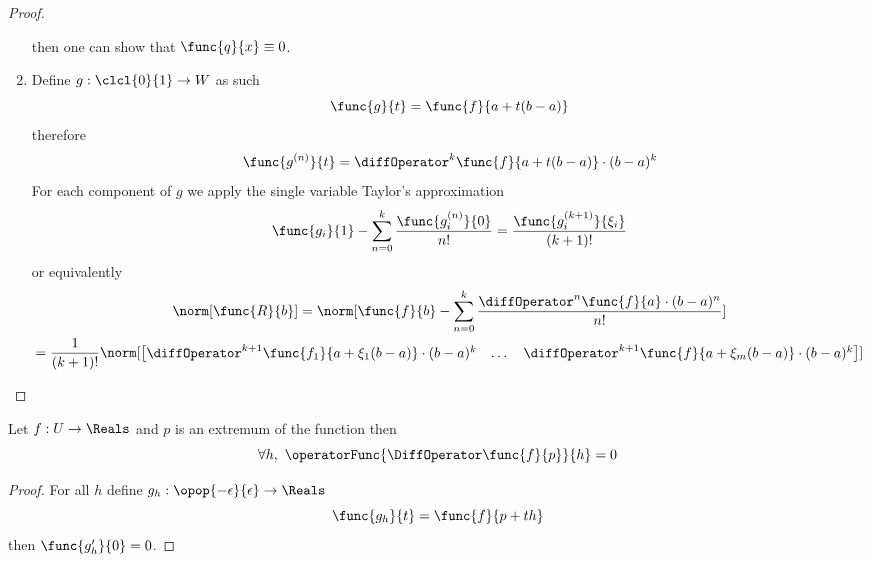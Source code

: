 \begin{proof}
\begin{enumerate}
\begin{equation*}
              \end{equation*}
              then one can show that \(\func{q}{x} \equiv 0\). %
        \item Define \(g: \clcl{0}{1} \to W\) as such
              \begin{equation*}
                  \func{g}{t} = \func{f}{a + t(b-a)}
              \end{equation*}
              therefore
              \begin{equation*}
                  \func{g^{(n)}}{t} = \diffOperator^k \func{f}{a + t(b-a)} \cdot (b-a)^k
              \end{equation*}
              For each component of \(g\) we apply the single variable Taylor's approximation
              \begin{equation*}
                  \func{g_i}{1} - \sum_{n = 0}^{k} \dfrac{\func{g^{(n)}_i}{0}}{n!} = \dfrac{\func{g^{(k+1)}_i}{\xi_i}}{(k+1)!}
              \end{equation*}
              or equivalently
              \begin{multline*}
                  \norm[\func{R}{b}] =\norm[ \func{f}{b} - \sum_{n = 0}^{k} \dfrac{\diffOperator^n \func{f}{a} \cdot (b-a)^n}{n!} ] \\= \dfrac{1}{(k+1)!} \norm[ {\begin{bmatrix}
                                  \diffOperator^{k+1} \func{f_1}{a + \xi_1(b-a)} \cdot (b-a)^k & \dots & \diffOperator^{k+1} \func{f}{a + \xi_m(b-a)} \cdot (b-a)^k
                              \end{bmatrix}} ] %
              \end{multline*}
    \end{enumerate}
\end{proof}

\begin{theorem}
    Let \(f : U \to \Reals\) and \(p\) is an extremum of the function then
    \begin{equation*}
        \forall h, \ \operatorFunc{\DiffOperator \func{f}{p}}{h} = 0
    \end{equation*}
\end{theorem}

\begin{proof}
    For all \(h\) define \(g_h : \opop{-\epsilon}{\epsilon} \to \Reals\)
    \begin{equation*}
        \func{g_h}{t} = \func{f}{p + th}
    \end{equation*}
    then \(\func{g'_h}{0} = 0\).
\end{proof}

